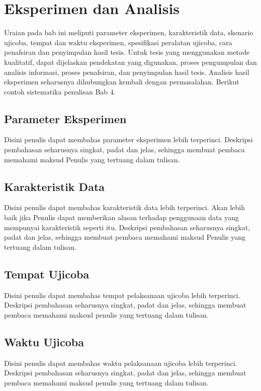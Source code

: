 \chapter{Eksperimen dan Analisis}
\label{bab:eksperimen}

Uraian pada bab ini meliputi parameter eksperimen, karakteristik data, skenario
ujicoba, tempat dan waktu eksperimen, spesifikasi peralatan ujicoba, cara
penafsiran dan penyimpulan hasil tesis. Untuk tesis yang menggunakan metode
kualitatif, dapat dijelaskan pendekatan yang digunakan, proses pengumpulan dan
analisis informasi, proses penafsiran, dan penyimpulan hasil tesis. Analisis
hasil eksperimen seharusnya dihubungkan kembali dengan permasalahan. Berikut
contoh sistematika penulisan Bab 4.

\section{Parameter Eksperimen}

Disini penulis dapat membahas parameter eksperimen lebih terperinci. Deskripsi
pembahasan seharusnya singkat, padat dan jelas, sehingga membuat pembaca
memahami maksud Penulis yang tertuang dalam tulisan.

\section{Karakteristik Data}

Disini penulis dapat membahas karakteristik data lebih terperinci. Akan lebih
baik jika Penulis dapat memberikan alasan terhadap penggunaan data yang
mempunyai karakteristik seperti itu. Deskripsi pembahasan seharusnya singkat,
padat dan jelas, sehingga membuat pembaca memahami maksud Penulis yang
tertuang dalam tulisan.

\section{Tempat Ujicoba}

Disini penulis dapat membahas tempat pelaksanaan ujicoba lebih terperinci.
Deskripsi pembahasan seharusnya singkat, padat dan jelas, sehingga membuat
pembaca memahami maksud penulis yang tertuang dalam tulisan.

\section{Waktu Ujicoba}

Disini penulis dapat membahas waktu pelaksanaan ujicoba lebih terperinci.
Deskripsi pembahasan seharusnya singkat, padat dan jelas, sehingga membuat
pembaca memahami maksud penulis yang tertuang dalam tulisan.

